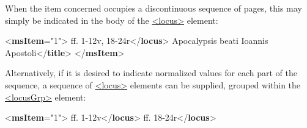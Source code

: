 When the item concerned occupies a discontinuous sequence of pages, this may simply be indicated in the body of the \hyperref[TEI.locus]{<locus>} element: \par\bgroup{}\exampleFont \begin{shaded}\noindent\mbox{}{<\textbf{msItem}\hspace*{1em}{n}="{1}">}\mbox{}\newline 
{}ff. 1-12v, 18-24r{</\textbf{locus}>}\mbox{}\newline 
{}Apocalypsis beati Ioannis Apostoli{</\textbf{title}>}\mbox{}\newline 
{</\textbf{msItem}>}\end{shaded}\egroup\par \noindent  Alternatively, if it is desired to indicate normalized values for each part of the sequence, a sequence of \hyperref[TEI.locus]{<locus>} elements can be supplied, grouped within the \hyperref[TEI.locusGrp]{<locusGrp>} element: \par\bgroup{}\exampleFont \begin{shaded}\noindent\mbox{}{<\textbf{msItem}\hspace*{1em}{n}="{1}">}\mbox{}\newline 
{}\mbox{}\newline 
\hspace*{1em}ff. 1-12v{</\textbf{locus}>}\mbox{}\newline 
\hspace*{1em}ff. 18-24r{</\textbf{locus}>}\mbox{}\newline 

\end{shaded}

